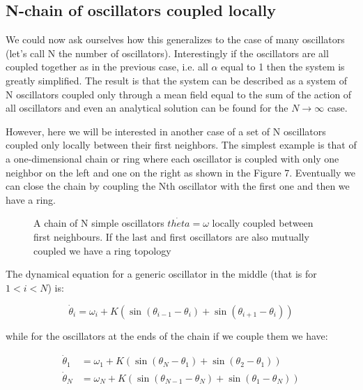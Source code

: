\documentclass{article}
\begin{document}
\newpage

\subsection{N-chain of oscillators coupled locally}

We could now ask ourselves how this generalizes to the case of many oscillators (let's call N the number of oscillators). 
Interestingly if the oscillators are all coupled together as in the previous case, i.e. all $\alpha$ equal to 1 then the system is greatly simplified. 
The result is that the system can be described as a system of N oscillators coupled only through a mean field equal to the sum of the action of all oscillators and even an analytical solution can be found for the $N \rightarrow \infty$ case.

However,  here we will be interested in another case of a set of N oscillators coupled only locally between their first neighbors. 
The simplest example is that of a one-dimensional chain or ring where each oscillator is coupled with only one neighbor on the left and one on the right as shown in the Figure 7. 
Eventually we can close the chain by coupling the Nth oscillator with the first one and then we have a ring. 

\begin{figure} [h]
    \centerline{}
    \caption{A chain of N simple oscillators $\dot{theta}=\omega$ locally coupled between first neighbours. If the last and first oscillators are also mutually coupled we have a ring topology}
    \label{fig_threecoupled}
\end{figure}

The dynamical equation for a generic oscillator in the middle (that is for $1<i<N$) is:

\begin{equation} \label{eq_Ncoupled}
    \dot{\theta}_i = \omega_i + K \left(\sin(\theta_{i-1} - \theta_i)+\sin(\theta_{i+1} - \theta_i)\right)  
\end{equation}

while for the oscillators at the ends of the chain if we couple
them we have:

\begin{subequations} \label{eq_Ncoupledb}
\begin{align} 
    \dot{\theta}_1 &= \omega_1 + K \left(\sin(\theta_{N}
    - \theta_1)+\sin(\theta_{2} - \theta_1)\right) \\  
     \dot{\theta}_N &= \omega_N + K \left(\sin(\theta_{N-1}
    - \theta_N)+\sin(\theta_{1} - \theta_N)\right)  
\end{align}
\end{subequations}
\end{document}
